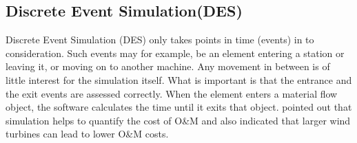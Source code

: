 \subsection{Discrete Event Simulation(DES)}
 Discrete Event Simulation (DES) only takes points in time (events) in to consideration. Such events may for example, be an element entering a station or leaving it, or moving on to another machine. Any movement in between is of little interest for the simulation itself. What is important is that the entrance and the exit events are assessed correctly. When the element enters a material flow object, the software calculates the time until it exits that object. \cite{Hofmann2014} pointed out that simulation helps to quantify the cost of O&M and also indicated that larger wind turbines can lead to lower O&M costs. 
